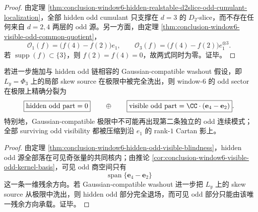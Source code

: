 \begin{proof}
由定理 \ref{thm:conclusion-window6-hidden-realstable-d2slice-odd-cumulant-localization}，全部 hidden odd cumulant 只支撑在 \(d=3\) 的 \(D_2\)-slice，而不存在任何来自 \(d=2,4\) 两层的 odd 源。另一方面，由定理 \ref{thm:conclusion-window6-visible-odd-common-quotient}，
\[
\mathcal O_1(f)=\bigl(f(4)-f(2)\bigr)e_1,
\qquad
\mathcal O_3(f)=\bigl(f(4)-f(2)\bigr)e_1^{\otimes 3}.
\]
若 \(\operatorname{supp}(f)\subset\{3\}\)，则 \(f(2)=f(4)=0\)，故两式同时为零。证毕。
\end{proof}

\begin{corollary}\label{cor:conclusion-window6-gaussian-compatible-odd-decoupling}
若进一步施加与 hidden odd 链相容的 Gaussian-compatible washout 假设，即 \(L_y=\Phi_3\) 上的局部 skew source 在极限中被完全洗出，则 window-\(6\) 的 odd sector 在极限上精确分裂为
\[
\boxed{\text{hidden odd part}=0}
\qquad\oplus\qquad
\boxed{\text{visible odd part}=\CC\cdot(\mathbf e_4-\mathbf e_2)}.
\]
特别地，Gaussian-compatible 极限中不可能再出现第二条独立的 odd 连续模式；全部 surviving odd visibility 都被压缩到沿 \(e_1\) 的 rank-\(1\) Cartan 影上。
\end{corollary}

\begin{proof}
由定理 \ref{thm:conclusion-window6-hidden-odd-visible-blindness}，hidden odd 源全部落在可见奇张量的共同核内；由推论 \ref{cor:conclusion-window6-visible-odd-kernel-basis}，可见 odd 商空间只有
\[
\operatorname{span}\{\mathbf e_4-\mathbf e_2\}
\]
这一条一维残余方向。若 Gaussian-compatible washout 进一步把 \(L_y\) 上的 skew source 从极限中洗出，则 hidden odd 部分完全退场，而可见 odd 部分只能由该唯一残余方向承载。证毕。
\end{proof}

